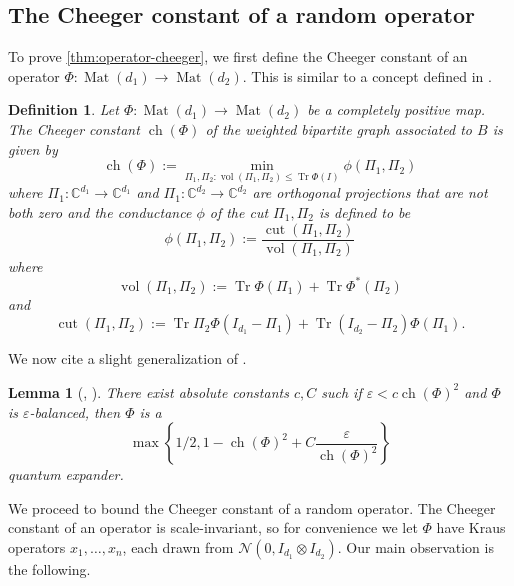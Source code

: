 \documentclass{article}
\newtheorem{lemma}[theorem]{Lemma}
\newtheorem{definition}{Definition}
\newcommand{\C}{{\mathbb{C}}}
\newcommand{\ot}{\otimes}
\newcommand{\mat}{\operatorname{Mat}}
\newcommand{\ch}{\operatorname{ch}}
\newcommand{\cut}{\operatorname{cut}}
\newcommand{\vol}{\operatorname{vol}}
\newcommand\eps{\varepsilon}
\newcommand\cN{\mathcal{N}}
\newcommand\samp{x}
\newcommand\tr{\operatorname{Tr}}
\begin{document}
\subsection{The Cheeger constant of a random operator}

To prove \cref{thm:operator-cheeger}, we first define the Cheeger constant of an operator $\Phi:\mat(d_1) \to \mat(d_2)$. This is similar to a concept defined in \cite{H07}.
\begin{definition}
Let $\Phi : \mat(d_1) \to \mat(d_2)$ be a completely positive map. The Cheeger constant $\ch(\Phi)$ of the weighted bipartite graph associated to $B$ is given by
$$\ch(\Phi):=\min_{\Pi_1, \Pi_2: \vol(\Pi_1, \Pi_2) \leq \tr \Phi(I)} \phi(\Pi_1,\Pi_2)$$
where $\Pi_1: \C^{d_1} \to \C^{d_1}$ and $\Pi_1: \C^{d_2} \to \C^{d_2}$ are orthogonal projections that are not both zero and the \emph{conductance} $\phi$ of the cut $\Pi_1, \Pi_2$ is defined to be
$$\phi(\Pi_1,\Pi_2) := \frac{\cut(\Pi_1, \Pi_2)}{\vol(\Pi_1,\Pi_2)}$$
where
$$ \vol(\Pi_1,\Pi_2):=
\tr \Phi(\Pi_1) + \tr \Phi^*(\Pi_2)$$
and $$ \cut(\Pi_1, \Pi_2):= \tr \Pi_2 \Phi(I_{d_1} - \Pi_1) + \tr (I_{d_2} - \Pi_2) \Phi(\Pi_1).$$
\end{definition}

We now cite a slight generalization of \cite{FM20}.

\begin{lemma} [\cite{FM20}, \cite{KLR19}]\label{lem:op-cheeger} There exist absolute constants $c, C$ such if $\eps < c \ch(\Phi)^2$ and $\Phi$ is $\eps$-balanced, then $\Phi$ is a
$$ \max\left\{1/2, 1 -  \ch(\Phi)^2 + C \frac{\eps}{\ch(\Phi)^2} \right\}$$
quantum expander.
\end{lemma}
We proceed to bound the Cheeger constant of a random operator. The Cheeger constant of an operator is scale-invariant, so for convenience we let $\Phi$ have Kraus operators $\samp_1, \dots, \samp_n$, each drawn from $\cN(0,  I_{d_1} \ot I_{d_2}).$ Our main observation is the following.
\end{document}
